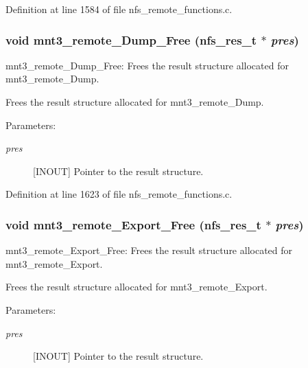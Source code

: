 Definition at line 1584 of file nfs\_\-remote\_\-functions.c.
\subsubsection[{mnt3\_\-remote\_\-Dump\_\-Free}]{\setlength{\rightskip}{0pt plus 5cm}void mnt3\_\-remote\_\-Dump\_\-Free (nfs\_\-res\_\-t $\ast$ {\em pres})}\label{group__NFSprocs_g6a89ecdac7c805814eff7333f49d1329}


mnt3\_\-remote\_\-Dump\_\-Free: Frees the result structure allocated for mnt3\_\-remote\_\-Dump.

Frees the result structure allocated for mnt3\_\-remote\_\-Dump.

\begin{Desc}
\item[Parameters:]
\begin{description}
\item[{\em pres}][INOUT] Pointer to the result structure. \end{description}
\end{Desc}


Definition at line 1623 of file nfs\_\-remote\_\-functions.c.
\subsubsection[{mnt3\_\-remote\_\-Export\_\-Free}]{\setlength{\rightskip}{0pt plus 5cm}void mnt3\_\-remote\_\-Export\_\-Free (nfs\_\-res\_\-t $\ast$ {\em pres})}\label{group__NFSprocs_g31328cb5471dbffad50ccb982f4c68de}


mnt3\_\-remote\_\-Export\_\-Free: Frees the result structure allocated for mnt3\_\-remote\_\-Export.

Frees the result structure allocated for mnt3\_\-remote\_\-Export.

\begin{Desc}
\item[Parameters:]
\begin{description}
\item[{\em pres}][INOUT] Pointer to the result structure. \end{description}
\end{Desc}


